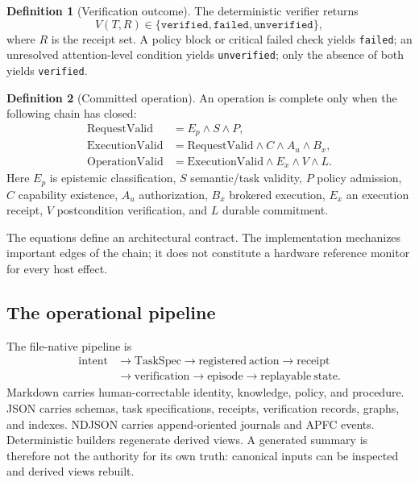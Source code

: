 \documentclass[10pt,twocolumn]{article}
\theoremstyle{definition}
\newtheorem{definition}{Definition}
\theoremstyle{plain}
\theoremstyle{remark}
\newcommand{\file}[1]{\nolinkurl{#1}}
\begin{document}
\begin{definition}[Verification outcome]
The deterministic verifier returns
\[
V(T,R)\in\{\texttt{verified},\texttt{failed},\texttt{unverified}\},
\]
where $R$ is the receipt set.  A policy block or critical failed check yields \file{failed}; an unresolved attention-level condition yields \file{unverified}; only the absence of both yields \file{verified}.
\end{definition}

\begin{definition}[Committed operation]
An operation is complete only when the following chain has closed:
\begin{align}
\mathrm{RequestValid} &= E_p\land S\land P,\\
\mathrm{ExecutionValid} &= \mathrm{RequestValid}\land C\land A_u\land B_x,\\
\mathrm{OperationValid} &= \mathrm{ExecutionValid}\land E_x\land V\land L.
\end{align}
Here $E_p$ is epistemic classification, $S$ semantic/task validity, $P$ policy admission, $C$ capability existence, $A_u$ authorization, $B_x$ brokered execution, $E_x$ an execution receipt, $V$ postcondition verification, and $L$ durable commitment.
\end{definition}

The equations define an architectural contract.  The implementation mechanizes important edges of the chain; it does not constitute a hardware reference monitor for every host effect.

\subsection{The operational pipeline}

The file-native pipeline is
\begin{equation}
\begin{split}
\mathrm{intent}&\rightarrow\mathrm{TaskSpec}\rightarrow\mathrm{registered\ action}\rightarrow\mathrm{receipt}\\
&\rightarrow\mathrm{verification}\rightarrow\mathrm{episode}\rightarrow\mathrm{replayable\ state}.
\end{split}
\label{eq:pipeline}
\end{equation}
Markdown carries human-correctable identity, knowledge, policy, and procedure.  JSON carries schemas, task specifications, receipts, verification records, graphs, and indexes.  NDJSON carries append-oriented journals and APFC events.  Deterministic builders regenerate derived views.  A generated summary is therefore not the authority for its own truth: canonical inputs can be inspected and derived views rebuilt.
\end{document}
